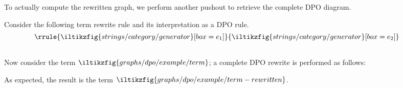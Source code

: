 To actually compute the rewritten graph, we perform another pushout to retrieve
the complete DPO diagram.

\begin{center}
\end{center}

\begin{example}
    Consider the following term rewrite rule and its interpretation as a DPO
    rule. \[
        \raisebox{1.5em}{\(\rrule{
                \iltikzfig{strings/category/generator}[box=e_1]
            }{
                \iltikzfig{strings/category/generator}[box=e_2]
            }\)}
        \qquad
        
    \]
    Now consider the term \(
    \iltikzfig{graphs/dpo/example/term}
    \); a complete DPO rewrite is performed as follows:
    \begin{center}
        
    \end{center}
    As expected, the result is the term \(
    \iltikzfig{graphs/dpo/example/term-rewritten}
    \).
\end{example}